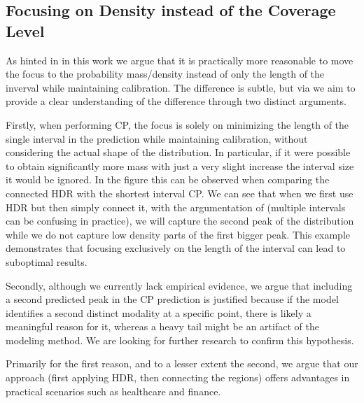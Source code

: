 \subsection{Focusing on Density instead of the Coverage Level}\label{sec:density_focus}

As hinted in  in this work we argue that it is practically more reasonable to move the focus to the probability mass/density instead of only the length of the inverval while maintaining calibration. The difference is subtle, but via  we aim to provide a clear understanding of the difference through two distinct arguments.

Firstly, when performing CP, the focus is solely on minimizing the length of the single interval in the prediction while maintaining calibration, without considering the actual shape of the distribution. In particular, if it were possible to obtain significantly more mass with just a very slight increase the interval size it would be ignored. In the figure this can be observed when comparing the connected HDR with the shortest interval CP. We can see that when we first use HDR but then simply connect it, with the argumentation of \cite{sesia2021conformal}(multiple intervals can be confusing in practice), we will capture the second peak of the distribution while we do not capture low density parts of the first bigger peak. This example demonstrates that focusing exclusively on the length of the interval can lead to suboptimal results.

Secondly, although we currently lack empirical evidence, we argue that including a second predicted peak in the CP prediction is justified because if the model identifies a second distinct modality at a specific point, there is likely a meaningful reason for it, whereas a heavy tail might be an artifact of the modeling method. We are looking for further research to confirm this hypothesis.

Primarily for the first reason, and to a lesser extent the second, we argue that our approach (first applying HDR, then connecting the regions) offers advantages in practical scenarios such as healthcare and finance.

